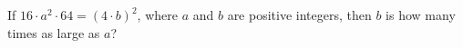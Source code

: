 If $16\cdot a^2\cdot64=(4\cdot b)^2$, where $a$ and $b$ are positive integers, then $b$ is how many times as large as $a$?
